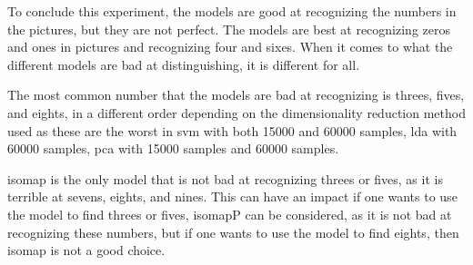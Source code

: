To conclude this experiment, the models are good at recognizing the numbers in the pictures, but they are not perfect. The models are best at recognizing zeros and ones in pictures and recognizing four and sixes. When it comes to what the different models are bad at distinguishing, it is different for all.

The most common number that the models are bad at recognizing is threes, fives, and eights, in a different order depending on the dimensionality reduction method used as these are the worst in \gls{svm} with both 15000 and 60000 samples, \gls{lda} with 60000 samples, \gls{pca} with 15000 samples and 60000 samples.

\gls{isomap} is the only model that is not bad at recognizing threes or fives, as it is terrible at sevens, eights, and nines. This can have an impact if one wants to use the model to find threes or fives, \gls{isomap}P can be considered, as it is not bad at recognizing these numbers, but if one wants to use the model to find eights, then \gls{isomap} is not a good choice.
